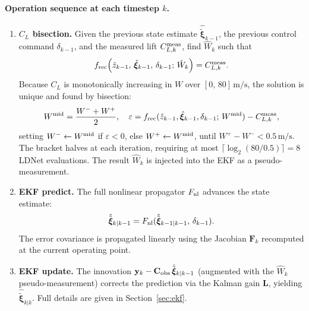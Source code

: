 \documentclass[11pt,a4paper]{article}
\newcommand{\vxi}{\bm{\xi}}
\begin{document}
\paragraph{Operation sequence at each timestep $k$.}
\begin{enumerate}
  \item \textbf{$C_L$ bisection.}
        Given the previous state estimate $\hat{\tilde{\vxi}}_{k-1}$,
        the previous control command $\delta_{k-1}$, and the measured lift
        $C_{L,k}^{\rm meas}$, find $\hat{W}_k$ such that
        \begin{equation}
          f_{\rm rec}\!\left(\hat{z}_{k-1},\,\hat{\vxi}_{k-1},\,\delta_{k-1};\,
          \hat{W}_k\right) = C_{L,k}^{\rm meas}.
          \label{eq:cl_inversion}
        \end{equation}
        Because $C_L$ is monotonically increasing in $W$ over
        $[0,\,80]\,\text{m/s}$, the solution is unique and found by bisection:
        \begin{equation}
          W^{\rm mid} = \frac{W^- + W^+}{2}, \quad
          \varepsilon = f_{\rm rec}(\hat{z}_{k-1}, \hat{\vxi}_{k-1}, \delta_{k-1};\,
                        W^{\rm mid}) - C_{L,k}^{\rm meas},
          \label{eq:bisection_step}
        \end{equation}
        setting $W^- \leftarrow W^{\rm mid}$ if $\varepsilon < 0$, else
        $W^+ \leftarrow W^{\rm mid}$, until $W^+ - W^- < 0.5\,\text{m/s}$.
        The bracket halves at each iteration, requiring at most
        $\lceil \log_2(80/0.5) \rceil = 8$ LDNet evaluations.
        The result $\hat{W}_k$ is injected into the EKF as a pseudo-measurement.

  \item \textbf{EKF predict.}
        The full nonlinear propagator $F_{\rm nl}$ advances the state estimate:
        \begin{equation}
          \hat{\tilde{\vxi}}_{k|k-1} = F_{\rm nl}(\hat{\tilde{\vxi}}_{k-1|k-1},\,\delta_{k-1}).
          \label{eq:ekf_pred_arch}
        \end{equation}
        The error covariance is propagated linearly using the Jacobian
        $\mathbf{F}_k$ recomputed at the current operating point.

  \item \textbf{EKF update.}
        The innovation $\mathbf{y}_k -
        \mathbf{C}_{\rm obs}\,\hat{\tilde{\vxi}}_{k|k-1}$ (augmented with the
        $\hat{W}_k$ pseudo-measurement) corrects the prediction via the Kalman
        gain $\mathbf{L}$, yielding $\hat{\tilde{\vxi}}_{k|k}$.
        Full details are given in Section~\ref{sec:ekf}.


\end{enumerate}
\end{document}

